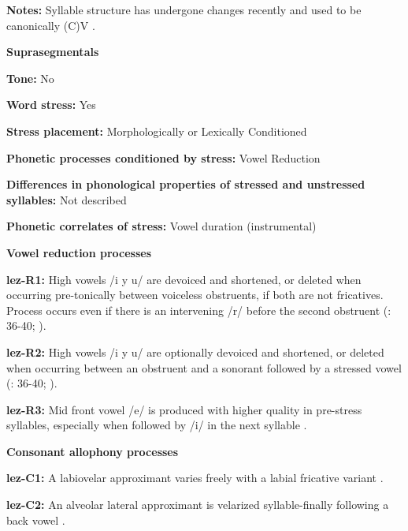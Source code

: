 \textbf{Notes:} Syllable structure has undergone changes recently and used to be canonically (C)V \citep[46]{Haspelmath1993}.



\textbf{Suprasegmentals}



\textbf{Tone:} No



\textbf{Word stress:} Yes



\textbf{Stress placement:} Morphologically or Lexically Conditioned



\textbf{Phonetic processes conditioned by stress:} Vowel Reduction



\textbf{Differences in phonological properties of stressed and unstressed syllables:} Not described



\textbf{Phonetic correlates of stress:} Vowel duration (instrumental)



\textbf{Vowel reduction processes}



\textbf{lez-R1:} High vowels /i y u/ are devoiced and shortened, or deleted when occurring pre-tonically between voiceless obstruents, if both are not fricatives. Process occurs even if there is an intervening /r/ before the second obstruent (\citealt{Haspelmath1993}: 36-40; \citealt{ChitoranBabaliyeva2007}).



\textbf{lez-R2:} High vowels /i y u/ are optionally devoiced and shortened, or deleted when occurring between an obstruent and a sonorant followed by a stressed vowel (\citealt{Haspelmath1993}: 36-40; \citealt{ChitoranBabaliyeva2007}).



\textbf{lez-R3:} Mid front vowel /e/ is produced with higher quality in pre-stress syllables, especially when followed by /i/ in the next syllable \citep[32]{Haspelmath1993}.



\textbf{Consonant allophony processes}



\textbf{lez-C1:} A labiovelar approximant varies freely with a labial fricative variant \citep[35]{Haspelmath1993}.



\textbf{lez-C2:} An alveolar lateral approximant is velarized syllable-finally following a back vowel \citep[35]{Haspelmath1993}.



